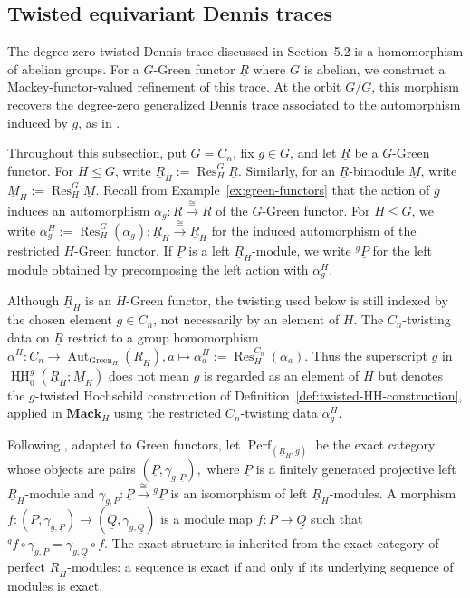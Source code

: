\documentclass[11pt,oneside]{amsart}
\DeclareMathOperator{\HH}{HH}
\numberwithin{equation}{section}
\numberwithin{figure}{section}
\theoremstyle{plain}
\theoremstyle{definition}
\theoremstyle{remark}
\begin{document}
 \subsection{Twisted equivariant Dennis traces} The degree-zero twisted Dennis trace discussed in Section~5.2 is a
homomorphism of abelian groups. For a \(G\)-Green functor \(\underline R\) where \(G\) is abelian, we construct a Mackey-functor-valued refinement of
this trace. At the orbit \(G/G\),
this morphism recovers the degree-zero generalized Dennis trace
associated to the automorphism induced by \(g\), as in
\cite[Section~6.1]{AGHKK}.

Throughout this subsection, put $G = C_n$, fix $g \in G$, and let $\underline{R}$ be a $G$-Green functor. For $H \le G$, write $\underline{R}_H := \operatorname{Res}_H^G \underline{R}$. Similarly, for an $\underline{R}$-bimodule $\underline{M}$, write $\underline{M}_H := \operatorname{Res}_H^G \underline{M}$. Recall from Example~\ref{ex:green-functors} that the action of $g$ induces an automorphism $\alpha_g\colon \underline{R} \xrightarrow{\cong} \underline{R}$ of the $G$-Green functor. For $H \le G$, we write $\alpha_g^H := \operatorname{Res}_H^G(\alpha_g)\colon \underline{R}_H \xrightarrow{\cong} \underline{R}_H$ for the induced automorphism of the restricted $H$-Green functor. If $\underline{P}$ is a left $\underline{R}_H$-module, we write ${}^g\underline{P}$ for the left module obtained by precomposing the left action with $\alpha_g^H$.

 


\begin{remark}\label{rem:restricted-twisting-data}
Although \(\underline R_H\) is an
\(H\)-Green functor, the twisting used below is still indexed by the
chosen element \(g\in C_n\), not necessarily by an element of \(H\). The \(C_n\)-twisting
data on \(\underline R\) restrict to a group homomorphism
\(
\alpha^H:C_n\to
\operatorname{Aut}_{\mathrm{Green}_H}(\underline R_H),
a\mapsto
\alpha_a^H:=\operatorname{Res}^{C_n}_H(\alpha_a).
\)
Thus the superscript \(g\) in
\(\underline{\HH}_0^g(\underline R_H;\underline M_H)\)
does not mean \(g\) is regarded as an element of \(H\) but denotes the \(g\)-twisted Hochschild construction of
Definition~\ref{def:twisted-HH-construction}, applied in
\(\mathbf{Mack}_H\) using the restricted \(C_n\)-twisting data \(\alpha_g^H\).
\end{remark}

 
Following \cite[Section~6.1]{AGHKK}, adapted to Green functors, let
\(\operatorname{Perf}_{(\underline R_H,g)}\)
be the exact category whose objects are pairs
\((\underline P,\gamma_{g,\underline P}),
\)
where \(\underline P\) is a finitely generated projective left
\(\underline R_H\)-module and
\(\gamma_{g,\underline P}\colon
\underline P\xrightarrow{\cong}{}^g\underline P\) is an isomorphism of left
\(\underline R_H\)-modules.  A morphism
\(
f\colon(\underline P,\gamma_{g,\underline P})
\to
(\underline Q,\gamma_{g,\underline Q})
\)
is a module map \(f\colon \underline P\to\underline Q\) such that
\(
{}^g f\circ \gamma_{g,\underline P}
=
\gamma_{g,\underline Q}\circ f .
\)
The exact structure is inherited from the exact category of perfect
\(\underline R_H\)-modules: a sequence is exact if
and only if its underlying sequence of modules is exact.
\end{document}
